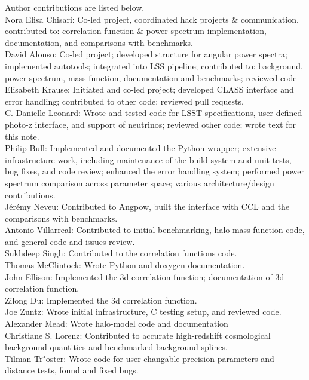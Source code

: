 Author contributions are listed below. \\
Nora Elisa Chisari: Co-led project, coordinated hack projects \& communication, contributed to: correlation function \& power spectrum implementation, documentation, and comparisons with benchmarks. \\
David Alonso: Co-led project; developed structure for angular power spectra; implemented autotools; integrated into LSS pipeline; contributed to: background, power spectrum, mass function, documentation and benchmarks; reviewed code \\
Elisabeth Krause: Initiated and co-led project; developed CLASS interface and error handling; contributed to other code; reviewed pull requests. \\
C. Danielle Leonard: Wrote and tested code for LSST specifications, user-defined photo-z interface, and support of neutrinos; reviewed other code; wrote text for this note. \\
Philip Bull: Implemented and documented the Python wrapper; extensive infrastructure work, including maintenance of the build system and unit tests, bug fixes, and code review; enhanced the error handling system; performed power spectrum comparison across parameter space; various architecture/design contributions. \\
J\'er\'emy Neveu: Contributed to Angpow, built the interface with CCL and the comparisons with benchmarks. \\
Antonio Villarreal: Contributed to initial benchmarking, halo mass function code, and general code and issues review. \\
Sukhdeep Singh: Contributed to the correlation functions code. \\
Thomas McClintock: Wrote Python and doxygen documentation. \\
John Ellison: Implemented the 3d correlation function; documentation of 3d correlation function. \\
Zilong Du: Implemented the 3d correlation function. \\
Joe Zuntz: Wrote initial infrastructure, C testing setup, and reviewed code. \\
Alexander Mead: Wrote halo-model code and documentation \\
Christiane S. Lorenz: Contributed to accurate high-redshift cosmological background quantities and benchmarked background splines. \\
Tilman Tr\""oster: Wrote code for user-changable precision parameters and distance tests, found and fixed bugs. \\
